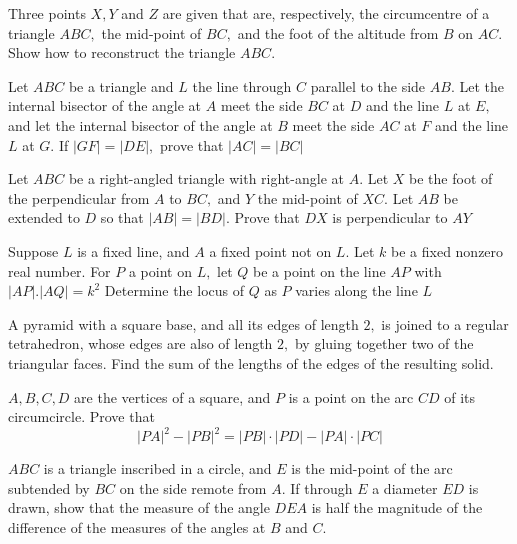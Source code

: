 \documentclass{pset}
\begin{document}
\begin{problems}
\begin{problem}[IrMO 1991 Q1]
    Three points \(X, Y\) and \(Z\) are given that are, respectively, the circumcentre of a triangle \(A B C,\) the mid-point of \(B C,\) and the foot of the altitude from \(B\) on \(A C\). Show how to reconstruct the triangle \(A B C\).
\end{problem}

\begin{problem}[IrMO 1991 Q8]
    Let \(A B C\) be a triangle and \(L\) the line through \(C\) parallel to the side \(A B .\) Let the internal bisector of the angle at \(A\) meet the side \(B C\) at \(D\) and the line \(L\) at \(E,\) and let the internal bisector of the angle at \(B\) meet the side \(A C\) at \(F\) and the line \(L\) at
    \(G .\) If \(|G F|=|D E|,\) prove that \(|A C|=|B C|\)
\end{problem}


\begin{problem}[IrMO 1990 Q5]
    Let \(A B C\) be a right-angled triangle with right-angle at \(A .\) Let \(X\) be the foot of the perpendicular from \(A\) to \(B C,\) and \(Y\) the mid-point of \(X C .\) Let \(A B\) be extended to
    \(D\) so that \(|A B|=|B D| .\) Prove that \(D X\) is perpendicular to \(A Y\)
\end{problem}

\begin{problem}[IrMO 1989 Q6]
    Suppose \(L\) is a fixed line, and \(A\) a fixed point not on \(L .\) Let \(k\) be a fixed nonzero real number. For \(P\) a point on \(L,\) let \(Q\) be a point on the line \(A P\) with \(|A P| .|A Q|=k^{2}\) Determine the locus of \(Q\) as \(P\) varies along the line \(L\)
\end{problem}

\begin{problem}[IrMO 1988 Q1]
    A pyramid with a square base, and all its edges of length \(2,\) is joined to a regular tetrahedron, whose edges are also of length \(2,\) by gluing together two of the triangular faces. Find the sum of the lengths of the edges of the resulting solid.
\end{problem}

\begin{problem}[IrMO 1988 Q2]
    \(A, B, C, D\) are the vertices of a square, and \(P\) is a point on the arc \(C D\) of its circumcircle. Prove that
$$
|P A|^{2}-|P B|^{2}=|P B| \cdot|P D|-|P A| \cdot|P C|
$$
\end{problem}

\begin{problem}[IrMO 1988 Q3]
    \(A B C\) is a triangle inscribed in a circle, and \(E\) is the mid-point of the arc subtended by \(B C\) on the side remote from \(A .\) If through \(E\) a diameter \(E D\) is drawn, show that the measure of the angle \(D E A\) is half the magnitude of the difference of the measures of the angles at \(B\) and \(C\).
\end{problem}


\end{problems}
\end{document}
